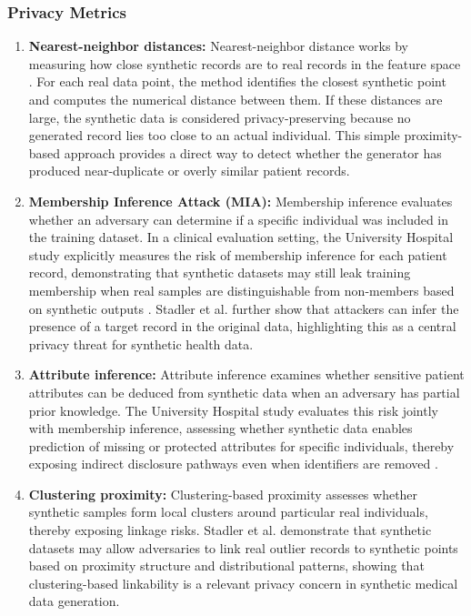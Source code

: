 \documentclass[master,proposal,extern,palatino]{rgseThesis}
\begin{document}
\subsubsection{Privacy Metrics}
\begin{enumerate}
    \item \textbf{Nearest-neighbor distances:} Nearest-neighbor distance works by measuring how close synthetic records are to real records in the feature space \cite{healthgan}. For each real data point, the method identifies the closest synthetic point and computes the numerical distance between them. If these distances are large, the synthetic data is considered privacy-preserving because no generated record lies too close to an actual individual. This simple proximity-based approach provides a direct way to detect whether the generator has produced near-duplicate or overly similar patient records.
    \item \textbf{Membership Inference Attack (MIA):} Membership inference evaluates whether an adversary can determine if a specific individual was included in the training dataset. In a clinical evaluation setting, the University Hospital study explicitly measures the risk of membership inference for each patient record, demonstrating that synthetic datasets may still leak training membership when real samples are distinguishable from non-members based on synthetic outputs \cite{syninhospital}. Stadler et al. \cite{stadler2022synthetic}further show that attackers can infer the presence of a target record in the original data, highlighting this as a central privacy threat for synthetic health data.
    \item \textbf{Attribute inference:} Attribute inference examines whether sensitive patient attributes can be deduced from synthetic data when an adversary has partial prior knowledge. The University Hospital study evaluates this risk jointly with membership inference, assessing whether synthetic data enables prediction of missing or protected attributes for specific individuals, thereby exposing indirect disclosure pathways even when identifiers are removed \cite{syninhospital}.
    \item \textbf{Clustering proximity:} Clustering-based proximity assesses whether synthetic samples form local clusters around particular real individuals, thereby exposing linkage risks. Stadler et al. \cite{stadler2022synthetic} demonstrate that synthetic datasets may allow adversaries to link real outlier records to synthetic points based on proximity structure and distributional patterns, showing that clustering-based linkability is a relevant privacy concern in synthetic medical data generation. 

\end{enumerate}
\end{document}

